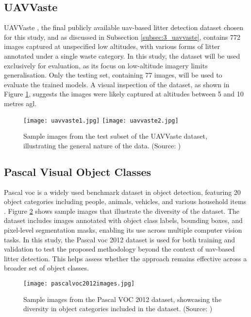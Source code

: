 \subsection{UAVVaste}
\label{subsec:4_uavvaste}

UAVVaste \cite{uavvaste}, the final publicly available \gls{uav}-based litter detection dataset chosen for this study, and as discussed in Subsection \ref{subsec:3_uavvaste}, contains 772 images captured at unspecified low altitudes, with various forms of litter annotated under a single waste category. In this study, the dataset will be used exclusively for evaluation, as its focus on low-altitude imagery limits generalisation. Only the testing set, containing 77 images, will be used to evaluate the trained models. A visual inspection of the dataset, as shown in Figure \ref{fig:uavvaste_samples}, suggests the images were likely captured at altitudes between 5 and 10 metres \gls{agl}.

\begin{figure}[!htbp]
  \centering
  \texttt{[image: uavvaste1.jpg]}
  \hfill
  \texttt{[image: uavvaste2.jpg]}
  \caption{Sample images from the test subset of the UAVVaste dataset, illustrating the general nature of the data. (Source: \cite{uavvaste})}
  \label{fig:uavvaste_samples}
\end{figure}


\subsection{Pascal Visual Object Classes}
\label{subsec:4_pascal_voc}

Pascal \gls{voc} is a widely used benchmark dataset in object detection, featuring 20 object categories including people, animals, vehicles, and various household items \cite{pascal-voc-2012}. Figure \ref{fig:pascal_voc} shows sample images that illustrate the diversity of the dataset. The dataset includes images annotated with object class labels, bounding boxes, and pixel-level segmentation masks, enabling its use across multiple computer vision tasks. In this study, the Pascal \gls{voc} 2012 dataset is used for both training and validation to test the proposed methodology beyond the context of \gls{uav}-based litter detection. This helps assess whether the approach remains effective across a broader set of object classes. 

\begin{figure}[!htbp]
    \centering
    \texttt{[image: pascalvoc2012images.jpg]}
    \caption{Sample images from the Pascal VOC 2012 dataset, showcasing the diversity in object categories included in the dataset. (Source: \cite{pascal-voc-2012})}
    \label{fig:pascal_voc}%
\end{figure}

